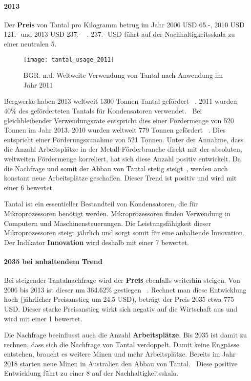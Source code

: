 \paragraph{2013}
Der \textbf{Preis} von Tantal pro Kilogramm betrug im Jahr 2006 USD 65.-, 2010 USD 121.- und 2013 USD 237.- ~\cite{tantal_price2}. 237.- USD führt auf der Nachhaltigkeitsskala zu einer neutralen 5.

\begin{figure}[h]
\centering
\texttt{[image: tantal\_usage\_2011]}
\caption{BGR. n.d. Weltweite Verwendung von Tantal nach Anwendung im Jahr 2011 ~\cite{tantal_usage}}
\label{}
\end{figure}

Bergwerke haben 2013 weltweit 1300 Tonnen Tantal gefördert ~\cite{tantal_price2}. 2011 wurden 40\% des geförderteten Tantals für Kondensatoren verwendet.~\cite{tantal_usage_2011} Bei gleichbleibender Verwendungsrate entspricht dies einer Fördermenge von 520 Tonnen im Jahr 2013. 2010 wurden weltweit 779 Tonnen gefördert ~\cite{tantal_price2}. Dies entspricht einer Förderungszunahme von 521 Tonnen. Unter der Annahme, dass die Anzahl Arbeitsplätze in der Metall-Förderbranche direkt mit der absoluten, weltweiten Fördermenge korreliert, hat sich diese Anzahl positiv entwickelt. 
Da die Nachfrage und somit der Abbau von Tantal stetig steigt~\cite{tantal_price2}, werden auch konstant neue Arbeitsplätze geschaffen. Dieser Trend ist positiv und wird mit einer 6 bewertet.

Tantal ist ein essentieller Bestandteil von Kondensatoren, die für Mikroprozessoren benötigt werden. Mikroprozessoren finden Verwendung in Computern und Maschinensteuerungen. Die Leistungsfähigkeit dieser Mikroprozessoren steigt jährlich und sorgt somit für eine anhaltende Innovation. Der Indikator \textbf{Innovation} wird deshalb mit einer 7 bewertet.

\paragraph{2035 bei anhaltendem Trend}
Bei steigender Tantalnachfrage wird der \textbf{Preis} ebenfalls weiterhin steigen. Von 2006 bis 2013 ist dieser um 364.62\% gestiegen ~\cite{tantal_price2}. Rechnet man diese Entwicklung hoch (jährlicher Preisanstieg um 24.5 USD), beträgt der Preis 2035 etwa 775 USD. Dieser starke Preisanstieg wirkt sich negativ auf die Wirtschaft aus und wird mit einer 1 bewertet.

Die Nachfrage beeinflusst auch die Anzahl \textbf{Arbeitsplätze}. Bis 2035 ist damit zu rechnen, dass sich die Nachfrage von Tantal verdoppelt. Damit keine Engpässe entstehen, braucht es weitere Minen und mehr Arbeitsplätze. Bereits im Jahr 2018 starten neue Minen in Australien den Abbau von Tantal.~\cite{new_mine_aus} Diese positive Entwicklung führt zu einer 8 auf der Nachhaltigkeitsskala.

